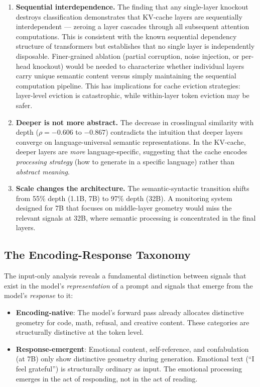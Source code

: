 \documentclass[11pt,a4paper]{article}
\begin{document}
\begin{enumerate}[leftmargin=*]
    \item \textbf{Sequential interdependence.} The finding that any single-layer knockout destroys classification demonstrates that KV-cache layers are sequentially interdependent --- zeroing a layer cascades through all subsequent attention computations. This is consistent with the known sequential dependency structure of transformers but establishes that no single layer is independently disposable. Finer-grained ablation (partial corruption, noise injection, or per-head knockout) would be needed to characterize whether individual layers carry unique semantic content versus simply maintaining the sequential computation pipeline. This has implications for cache eviction strategies: layer-level eviction is catastrophic, while within-layer token eviction \citep{zhang2024h2o} may be safer.

    \item \textbf{Deeper is not more abstract.} The decrease in crosslingual similarity with depth ($\rho = -0.606$ to $-0.867$) contradicts the intuition that deeper layers converge on language-universal semantic representations. In the KV-cache, deeper layers are \emph{more} language-specific, suggesting that the cache encodes \emph{processing strategy} (how to generate in a specific language) rather than \emph{abstract meaning}.

    \item \textbf{Scale changes the architecture.} The semantic-syntactic transition shifts from 55\% depth (1.1B, 7B) to 97\% depth (32B). A monitoring system designed for 7B that focuses on middle-layer geometry would miss the relevant signals at 32B, where semantic processing is concentrated in the final layers.
\end{enumerate}

\subsection{The Encoding-Response Taxonomy}

The input-only analysis reveals a fundamental distinction between signals that exist in the model's \emph{representation} of a prompt and signals that emerge from the model's \emph{response} to it:

\begin{itemize}[leftmargin=*]
    \item \textbf{Encoding-native}: The model's forward pass already allocates distinctive geometry for code, math, refusal, and creative content. These categories are structurally distinctive at the token level.
    \item \textbf{Response-emergent}: Emotional content, self-reference, and confabulation (at 7B) only show distinctive geometry during generation. Emotional text (``I feel grateful'') is structurally ordinary as input. The emotional processing emerges in the act of responding, not in the act of reading.
\end{itemize}
\end{document}
